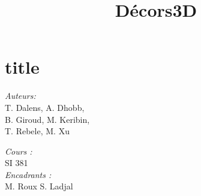 \documentclass[compress]{beamer} %
\begin{document}
 \title{Décors3D} 
 \section{title}
 \begin{frame}
\titlepage
    \centering
    \begin{minipage}{0.4\textwidth}
    \begin{flushleft} \large
    \emph{Auteurs:}\\
    T. Dalens, A. Dhobb,\\
    B. Giroud, M. Keribin,\\
    T. Rebele, M. Xu\\
    \end{flushleft}
    \end{minipage}
    \begin{minipage}{0.4\textwidth}
    \begin{flushright} \large
    \emph{Cours :}\\
    SI 381\\
    \emph{Encadrants :}\\
    M. Roux
    S. Ladjal
    \end{flushright}
    \end{minipage}\\[3cm]
 \end{frame}
 
 
 
 
 
 
 
 
\end{document}
